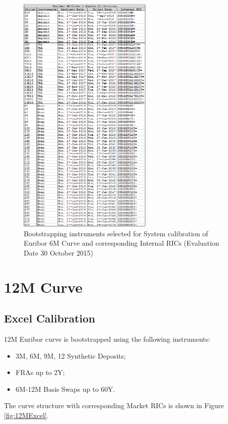\begin{figure}
\centering
\includegraphics[width=0.58\textwidth]{images/6MMx.png}
\caption{Bootstrapping instruments selected for System calibration of Euribor 6M Curve and corresponding Internal RICs (Evaluation Date 30 October 2015)}
\label{fig:6MMx}
\end{figure}

\section{12M Curve}

\subsection{Excel Calibration}

12M Euribor curve is bootstrapped using the following instruments:
\begin{itemize}
\item 3M, 6M, 9M, 12 Synthetic Deposits; 
\item FRAs up to 2Y;
\item 6M-12M Basis Swaps up to 60Y.
\end{itemize}
The curve structure with corresponding Market RICs is shown in Figure \ref{fig:12MExcel}.

